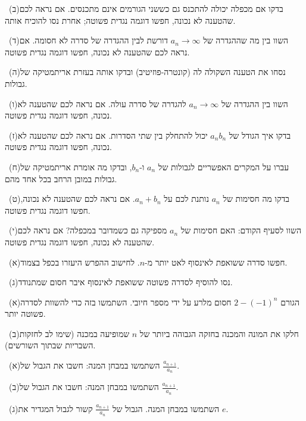 \documentclass[12pt, a4paper]{article}
\begin{document}
\noindent {}\ (ב)\enskip בדקו אם מכפלה יכולה להתכנס גם כששני הגורמים אינם מתכנסים. אם נראה לכם שהטענה לא נכונה, חפשו דוגמה נגדית פשוטה; אחרת נסו להוכיח אותה.\par\smallskip
\noindent {}\ (ד)\enskip השוו בין מה שההגדרה של $a_n\to\infty$ דורשת לבין ההגדרה של סדרה לא חסומה. אם נראה לכם שהטענה לא נכונה, חפשו דוגמה נגדית פשוטה.\par\smallskip
\noindent {}\ (ה)\enskip נסחו את הטענה השקולה לה (קונטרה-פוזיטיב) ובדקו אותה בעזרת אריתמטיקה של גבולות.\par\smallskip
\noindent {}\ (ו)\enskip השוו בין ההגדרה של $a_n\to\infty$ להגדרה של סדרה עולה. אם נראה לכם שהטענה לא נכונה, חפשו דוגמה נגדית פשוטה.\par\smallskip
\noindent {}\ (ז)\enskip בדקו איך הגודל של $a_nb_n$ יכול להתחלק בין שתי הסדרות. אם נראה לכם שהטענה לא נכונה, חפשו דוגמה נגדית פשוטה.\par\smallskip
\noindent {}\ (ח)\enskip עברו על המקרים האפשריים לגבולות של $a_n$ ו-$b_n$, ובדקו מה אומרת אריתמטיקה של גבולות במובן הרחב בכל אחד מהם.\par\smallskip
\noindent {}\ (ט)\enskip בדקו מה חסימות של $a_n$ נותנת לכם על $a_n+b_n$. אם נראה לכם שהטענה לא נכונה, חפשו דוגמה נגדית פשוטה.\par\smallskip
\noindent {}\ (י)\enskip השוו לסעיף הקודם: האם חסימות של $a_n$ מספיקה גם כשמדובר במכפלה? אם נראה לכם שהטענה לא נכונה, חפשו דוגמה נגדית פשוטה.\par\smallskip
\noindent {}\ (א)\enskip חפשו סדרה ששואפת לאינסוף לאט יותר מ-$n$. לחישוב ההפרש היעזרו בכפל בצמוד.\par\smallskip
\noindent {}\ (ג)\enskip נסו להוסיף לסדרה פשוטה ששואפת לאינסוף איבר חסום שמתנודד.\par\smallskip
\noindent {}\ (א)\enskip הגורם $2-(-1)^n$ חסום מלרע על ידי מספר חיובי. השתמשו בזה כדי להשוות לסדרה פשוטה יותר.\par\smallskip
\noindent {}\ (ב)\enskip חלקו את המונה והמכנה בחזקה הגבוהה ביותר של $n$ שמופיעה במכנה (שימו לב לחזקות השבריות שבתוך השורשים).\par\smallskip
\noindent {}\ (א)\enskip השתמשו במבחן המנה: חשבו את הגבול של $\frac{a_{n+1}}{a_n}$.\par\smallskip
\noindent {}\ (ב)\enskip השתמשו במבחן המנה: חשבו את הגבול של $\frac{a_{n+1}}{a_n}$.\par\smallskip
\noindent {}\ (ג)\enskip השתמשו במבחן המנה. הגבול של $\frac{a_{n+1}}{a_n}$ קשור לגבול המגדיר את $e$.\par\smallskip
\end{document}
